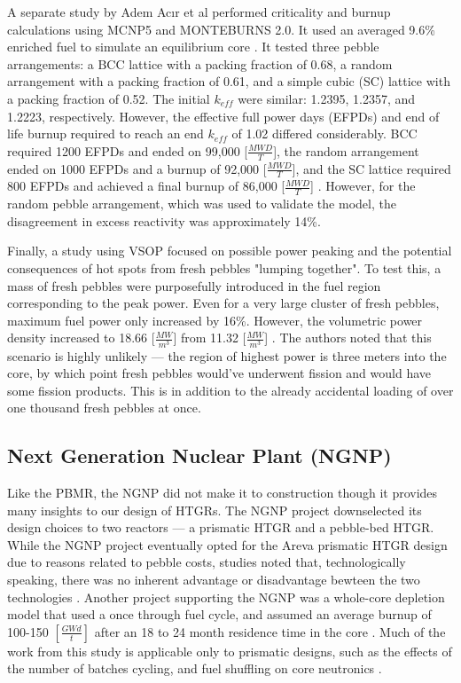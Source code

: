 A separate study by Adem Acır et al performed criticality and burnup calculations using MCNP5 and MONTEBURNS 2.0.  It used an averaged 9.6\% enriched fuel to simulate an equilibrium core \cite{noauthor_criticality_2011}.  It tested three pebble arrangements:  a BCC lattice with a packing fraction of 0.68, a random arrangement with a packing fraction of 0.61, and a simple cubic (SC) lattice with a packing fraction of 0.52.  The initial $k_{eff}$ were similar: 1.2395, 1.2357, and 1.2223, respectively.  However, the effective full power days (EFPDs) and end of life burnup required to reach an end $k_{eff}$  of 1.02 differed considerably.  BCC required 1200 EFPDs and ended on 99,000 [$\frac{MWD}{T}$], the random arrangement ended on 1000 EFPDs and a burnup of 92,000 [$\frac{MWD}{T}$], and the SC lattice required 800 EFPDs and achieved a final burnup of 86,000 [$\frac{MWD}{T}$] \cite{noauthor_criticality_2011}.  However, for the random pebble arrangement, which was used to validate the model, the disagreement in excess reactivity was approximately 14\%.

Finally, a study using VSOP focused on possible power peaking and the potential consequences of hot spots \cite{reitsma_investigation_2005} from fresh pebbles "lumping together".  To test this, a mass of fresh pebbles were purposefully introduced in the fuel region corresponding to the peak power.  Even for a very large cluster of fresh pebbles, maximum fuel power only increased by 16\%.  However, the volumetric power density increased to 18.66 [$\frac{MW}{m^3}$] from 11.32 [$\frac{MW}{m^3}$] \cite{reitsma_investigation_2005}.  The authors noted that this scenario is highly unlikely --- the region of highest power is three meters into the core, by which point fresh pebbles would've underwent fission and would have some fission products.  This is in addition to the already accidental loading of over one thousand fresh pebbles at once.

\subsection{Next Generation Nuclear Plant (NGNP)}

Like the PBMR, the NGNP did not make it to construction though it provides many insights to our design of HTGRs.  The NGNP project downselected its design choices to two reactors --- a prismatic HTGR and a pebble-bed HTGR.  While the NGNP project eventually opted for the Areva prismatic HTGR design \cite{noauthor_areva_nodate} due to reasons related to pebble costs, studies noted that, technologically speaking, there was no inherent advantage or disadvantage bewteen the two technologies \cite{inl_basis_2011}.  Another project supporting the NGNP was a whole-core depletion model that used a once through fuel cycle, and assumed an average burnup of 100-150 $\left[\frac{GWd}{t}\right]$ after an 18 to 24 month residence time in the core \cite{tkkim_whole-core_nodate}.  Much of the work from this study is applicable only to prismatic designs, such as the effects of the number of batches cycling, and fuel shuffling on core neutronics \cite{tkkim_whole-core_nodate}.

